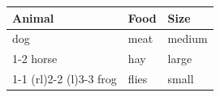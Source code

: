 \documentclass{article}
\begin{document}
\begin{tabular}{lll}
\toprule
Animal & Food & Size \\
\midrule
dog & meat & medium \\
\cmidrule{1-2}
horse & hay & large \\
\cmidrule(r){1-1}
\cmidrule(rl){2-2}
\cmidrule(l){3-3}
frog & flies & small \\
\bottomrule
\end{tabular}
\end{document}
